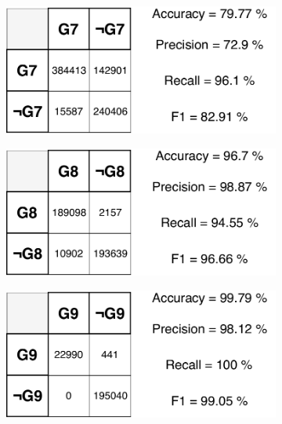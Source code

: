 \begin{figure}[H]
\vspace{3mm}
\begin{subfigure}{.33\textwidth}
  \centering
  \includegraphics[width=\textwidth]{tex/images/results/rese_g7}  
\end{subfigure}%
\begin{subfigure}{.33\textwidth}
  \centering
  \includegraphics[width=\textwidth]{tex/images/results/rese_g8}
\end{subfigure}
\begin{subfigure}{.33\textwidth}
  \centering
  \includegraphics[width=\textwidth]{tex/images/results/rese_g9}
\end{subfigure}


\end{figure}
